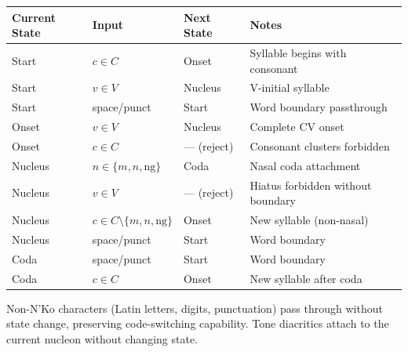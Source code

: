 \documentclass[
]{article}
\newcounter{none} %
\begin{document}
{\def\LTcaptype{none} %
\begin{longtable}[]{@{}
  >{\raggedright\arraybackslash}p{}
  >{\raggedright\arraybackslash}p{}
  >{\raggedright\arraybackslash}p{}
  >{\raggedright\arraybackslash}p{}@{}}
\toprule\noalign{}
\begin{minipage}[b]{\linewidth}\raggedright
Current State
\end{minipage} & \begin{minipage}[b]{\linewidth}\raggedright
Input
\end{minipage} & \begin{minipage}[b]{\linewidth}\raggedright
Next State
\end{minipage} & \begin{minipage}[b]{\linewidth}\raggedright
Notes
\end{minipage} \\
\midrule\noalign{}
\endhead
\bottomrule\noalign{}
\endlastfoot
Start & \(c \in C\) & Onset & Syllable begins with consonant \\
Start & \(v \in V\) & Nucleus & V-initial syllable \\
Start & space/punct & Start & Word boundary passthrough \\
Onset & \(v \in V\) & Nucleus & Complete CV onset \\
Onset & \(c \in C\) & --- (reject) & Consonant clusters forbidden \\
Nucleus & \(n \in \{m, n, \text{ng}\}\) & Coda & Nasal coda
attachment \\
Nucleus & \(v \in V\) & --- (reject) & Hiatus forbidden without
boundary \\
Nucleus & \(c \in C \setminus \{m,n,\text{ng}\}\) & Onset & New syllable
(non-nasal) \\
Nucleus & space/punct & Start & Word boundary \\
Coda & space/punct & Start & Word boundary \\
Coda & \(c \in C\) & Onset & New syllable after coda \\
\end{longtable}
}

Non-N'Ko characters (Latin letters, digits, punctuation) pass through
without state change, preserving code-switching capability. Tone
diacritics attach to the current nucleon without changing state.
\end{document}
